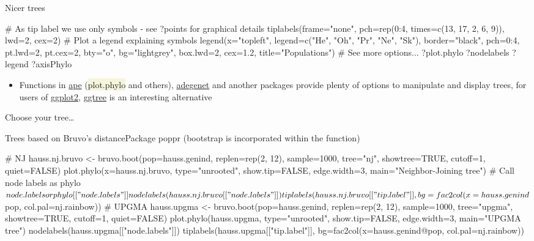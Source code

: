 \documentclass[compress, xelatex, 11pt, xcolor=svgnames, aspectratio=169,
	hyperref={
		bookmarks=true,
		unicode=true,
		colorlinks=true,
		pdftitle={Molecular data in R},
		plainpages=false,
		pdfauthor={Vojtech Zeisek},
		pdfsubject={Course about phylogeny and evolution in R},
		pdfcreator={XeLaTeX},
		pdfkeywords={R, evolution, phylogeny, molecular data},
		linkcolor=Crimson, %
		anchorcolor=Magenta, %
		citecolor=Magenta, %
		filecolor=Magenta, %
		menucolor=Magenta, %
		urlcolor=DodgerBlue, %
		},
	url={hyphens, lowtilde} %
	]{beamer}
\renewcommand{\texttt}[1]{\colorbox{Beige}{{\ttfamily #1}}}
\begin{document}
\begin{frame}[fragile]{Nicer trees}
	\begin{spluscode}
    # As tip label we use only symbols - see ?points for graphical details
    tiplabels(frame="none", pch=rep(0:4, times=c(13, 17, 2, 6, 9)), lwd=2,
      cex=2)
    # Plot a legend explaining symbols
    legend(x="topleft", legend=c("He", "Oh", "Pr", "Ne", "Sk"),
      border="black", pch=0:4, pt.lwd=2, pt.cex=2, bty="o", bg="lightgrey",
      box.lwd=2, cex=1.2, title="Populations")
    # See more options...
    ?plot.phylo
    ?nodelabels
    ?legend
    ?axisPhylo
	\end{spluscode}
	\begin{itemize}
		\item Functions in \href{https://CRAN.R-project.org/package=ape}{ape} (\texttt{plot.phylo} and others), \href{https://CRAN.R-project.org/package=adegenet}{adegenet} and another packages provide plenty of options to manipulate and display trees, for users of \href{https://CRAN.R-project.org/package=ggplot2}{ggplot2}, \href{https://bioconductor.org/packages/release/bioc/html/ggtree.html}{ggtree} is an interesting alternative
	\end{itemize}
\end{frame}

\begin{frame}{Choose your tree\ldots}
	\begin{center}
		\texttt{[image: nj2.png]}
	\end{center}
\end{frame}

\begin{frame}[fragile]{Trees based on Bruvo's distance}{Package poppr (bootstrap is incorporated within the function)}
	\begin{spluscode}
    # NJ
    hauss.nj.bruvo <- bruvo.boot(pop=hauss.genind, replen=rep(2, 12),
      sample=1000, tree="nj", showtree=TRUE, cutoff=1, quiet=FALSE)
    plot.phylo(x=hauss.nj.bruvo, type="unrooted", show.tip=FALSE,
      edge.width=3, main="Neighbor-Joining tree")
    # Call node labels as phylo$node.labels or phylo[["node.labels"]]
    nodelabels(hauss.nj.bruvo[["node.labels"]]) tiplabels(hauss.nj.bruvo
      [["tip.label"]], bg=fac2col(x=hauss.genind$pop, col.pal=nj.rainbow))
    # UPGMA
    hauss.upgma <- bruvo.boot(pop=hauss.genind, replen=rep(2, 12),
      sample=1000, tree="upgma", showtree=TRUE, cutoff=1, quiet=FALSE)
    plot.phylo(hauss.upgma, type="unrooted", show.tip=FALSE, edge.width=3,
      main="UPGMA tree")
    nodelabels(hauss.upgma[["node.labels"]])
    tiplabels(hauss.upgma[["tip.label"]], bg=fac2col(x=hauss.genind@pop,
      col.pal=nj.rainbow))
	\end{spluscode}
\end{frame}
\end{document}
